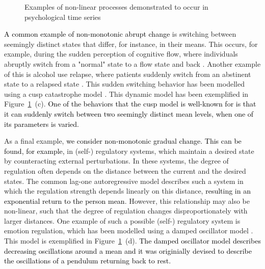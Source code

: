 \documentclass[man, floatsintext]{apa7}
\begin{document}
\begin{figure}[!t]
  \caption{Examples of non-linear processes demonstrated to occur in
    psychological time series}
  \label{fig:examplar_npn}
\end{figure}

\textcolor{black}{A common example of non-monotonic abrupt change}
is switching between seemingly distinct
states that differ, for instance, in their means. This occurs, for example,
during the sudden perception of cognitive flow, where individuals abruptly
switch from a "normal" state to a flow state and back
\parencite{ceja_suddenly_2012}. Another example of this is alcohol use relapse,
where patients suddenly switch from an abstinent state to a relapsed state
\parencite{witkiewitz_modeling_2007}. This sudden switching behavior has been
modelled using a cusp catastrophe model
\parencite{van_der_maas_sudden_2003,chow_cusp_2015}. This dynamic model has
been exemplified in Figure~\ref{fig:examplar_npn}~(c). \textcolor{black}{One of
  the behaviors that the cusp model is well-known for is that it can suddenly
  switch between two seemingly distinct mean levels, when one of its parameters
  is varied.}

As a final example, \textcolor{black}{we consider non-monotonic gradual change.
  This can be found, for example,} in (self-) regulatory systems, which
maintain a desired state by counteracting external perturbations. In these
systems, the degree of regulation often depends on the distance between the
current and the desired states. The common lag-one autoregressive model
describes such a system in which the regulation strength depends linearly on
this distance, \textcolor{black}{resulting in an exponential return to the
  person mean}. However, this relationship may also be non-linear, such that
the
degree of regulation changes disproportionately with larger distances. One
example of such a possible (self-) regulatory system is emotion regulation,
which has been modelled using a damped oscillator model
\parencite{chow_emotion_2005}. This model is exemplified in
Figure~\ref{fig:examplar_npn}~(d). \textcolor{black}{The damped oscillator
  model
  describes decreasing oscillations around a mean and it was originially
  devised to describe the oscillations of a pendulum returning back to rest.}
\end{document}

